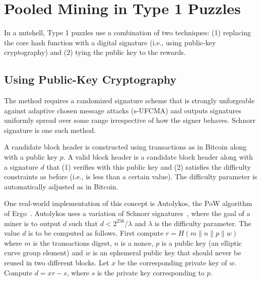 \documentclass[runningheads]{llncs}
\newcommand{\authnote}[2]{\marginpar{\parbox{\marginparwidth}{\tiny %
  \textsf{#1 {\textcolor{blue}{notes: #2}}}}}%
  \textcolor{blue}{\textbf{\dag}}}
\newcommand{\authnote}[2]{
  \textsf{#1 \textcolor{blue}{: #2}}}
\newcommand{\authnote}[2]{}
\newcommand{\snote}[1]{{\authnote{\textcolor{red}{Scalahub notes}}{#1}}}
\newcommand{\powname}{Autolykos\xspace}
\begin{document}
\section{Pooled Mining in Type 1 Puzzles}
\label{bypasstype1}

In a nutshell, Type 1 puzzles use a combination of two techniques: (1) replacing the core hash function with a digital signature (i.e., using public-key cryptography) and (2) tying the public key to the rewards.

\subsection{Using Public-Key Cryptography}

The method requires a randomized signature scheme that is strongly unforgeable against adaptive chosen message attacks (s-UFCMA) and outputs signatures uniformly spread over some range irrespective of how the signer behaves. Schnorr signature is one such method.

A candidate block header is constructed using transactions as in Bitcoin along with a public key $p$. A valid block header is a candidate block header along with a signature $d$ that (1) verifies with this public key and (2) satisfies the difficulty constraints as before (i.e., is less than a certain value). The difficulty parameter is automatically adjusted as in Bitcoin.

One real-world implementation of this concept is \powname \cite{autolykos}, the PoW algorithm of Ergo~\cite{ergo}. \powname uses a variation of Schnorr signatures~\cite{Sch91}, where the goal of a miner is to output $d$ such that $d < 2^{256}/\lambda$ and $\lambda$ is the difficulty parameter. The value $d$ is to be computed as follows. First compute $r = H(m\|n\|p\|w)$ where $m$ is the transactions digest, $n$ is a nonce, $p$ is a public key (an elliptic curve group element) and $w$ is an ephemeral public key that should never be reused in two different blocks. Let $x$ be the corresponding private key of $w$. Compute $d = xr - s$, where $s$ is the private key corresponding to $p$.


\end{document}
